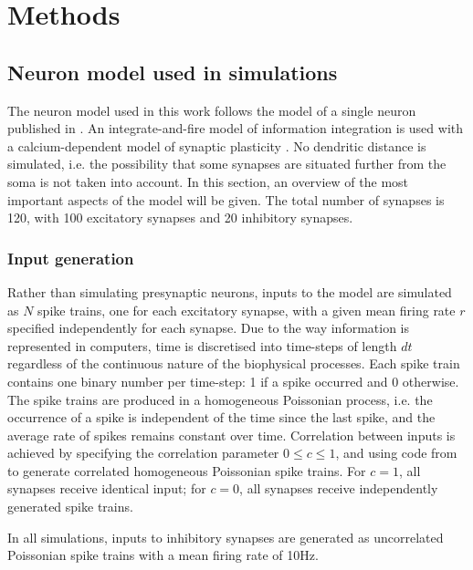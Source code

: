 \documentclass[a4paper,12pt]{report}
\theoremstyle{definition}
\begin{document}
\chapter{Methods}

\section{Neuron model used in simulations}
\label{methods-modelused}

The neuron model used in this work follows the model of a single neuron published in \cite{yeung2004synaptic}. An integrate-and-fire model of information integration is used with a calcium-dependent model of synaptic plasticity \cite{shouval2002unified}. No dendritic distance is simulated, i.e. the possibility that some synapses are situated further from the soma is not taken into account. In this section, an overview of the most important aspects of the model will be given. The total number of synapses is 120, with 100 excitatory synapses and 20 inhibitory synapses.



\subsection{Input generation}
Rather than simulating presynaptic neurons, inputs to the model are simulated as $N$ spike trains, one for each excitatory synapse, with a given mean firing rate $r$ specified independently for each synapse. Due to the way information is represented in computers, time is discretised into time-steps of length $dt$ regardless of the continuous nature of the biophysical processes. Each spike train contains one binary number per time-step: 1 if a spike occurred and 0 otherwise. The spike trains are produced in a homogeneous Poissonian process, i.e. the occurrence of a spike is independent of the time since the last spike, and the average rate of spikes remains constant over time.
Correlation between inputs is achieved by specifying the correlation parameter $0 \leq c \leq 1$, and using code from \cite{macke2009} to generate correlated homogeneous Poissonian spike trains. For $c=1$, all synapses receive identical input; for $c=0$, all synapses receive independently generated spike trains.

In all simulations, inputs to inhibitory synapses are generated as uncorrelated Poissonian spike trains with a mean firing rate of 10Hz.
\end{document}
